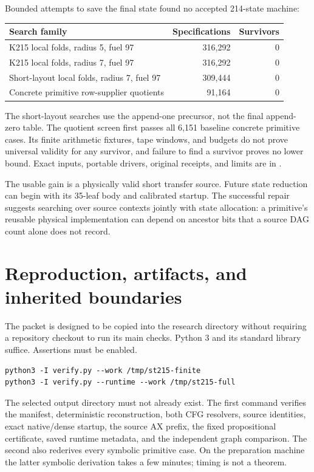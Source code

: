 \documentclass[11pt]{article}
\newcommand{\file}[1]{{\small\path{#1}}}
\begin{document}
Bounded attempts to save the final state found no
accepted 214-state machine:
\begin{center}\small
\begin{tabular}{lrr}
\toprule
Search family & Specifications & Survivors\\
\midrule
K215 local folds, radius 5, fuel 97 &316,292&0\\
K215 local folds, radius 7, fuel 97 &316,292&0\\
Short-layout local folds, radius 7, fuel 97 &309,444&0\\
Concrete primitive row-supplier quotients &91,164&0\\
\bottomrule
\end{tabular}
\end{center}
The short-layout searches use the append-one
precursor, not the final append-zero table.
The quotient screen first passes all 6,151
baseline concrete primitive cases. Its finite
arithmetic fixtures, tape windows, and budgets
do not prove universal validity for any survivor,
and failure to find a survivor proves no lower
bound. Exact inputs, portable drivers, original
receipts, and limits are in
\file{research/physical/}.

The usable gain is a physically valid short
transfer source. Future state reduction can begin
with its 35-leaf body and calibrated startup.
The successful repair suggests searching over
source contexts jointly with state allocation:
a primitive's reusable physical implementation
can depend on ancestor bits that a source DAG
count alone does not record.

\section{Reproduction, artifacts, and inherited boundaries}
\label{sec:reproduction}

The packet is designed to be copied into the research
directory without requiring a repository checkout
to run its main checks. Python 3 and its standard
library suffice. Assertions must be enabled.

\begin{verbatim}
python3 -I verify.py --work /tmp/st215-finite
python3 -I verify.py --runtime --work /tmp/st215-full
\end{verbatim}
The selected output directory must not already exist.
The first command verifies the manifest,
deterministic reconstruction, both CFG resolvers,
source identities, exact native/dense startup,
the source AX prefix, the fixed propositional
certificate, saved runtime metadata, and the
independent graph comparison. The second also
rederives every symbolic primitive case. On the
preparation machine the latter symbolic derivation
takes a few minutes; timing is not a theorem.
\end{document}
